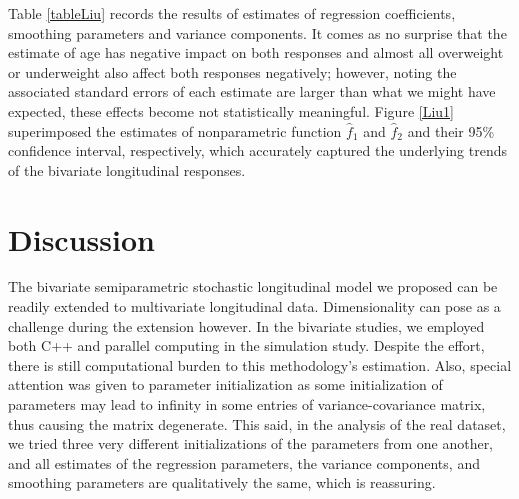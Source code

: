 \documentclass[article,lineno]{biometrika}
\begin{document}
Table \ref{tableLiu} records the results of estimates of regression coefficients, smoothing parameters and variance components. It comes as no surprise that the estimate of age has negative impact on both responses and almost all overweight or underweight also affect  both responses negatively; however, noting the associated standard errors of each estimate are larger than what we might have expected, these effects become not statistically meaningful. 
Figure \ref{Liu1} superimposed the estimates of nonparametric function $\hat f_1$ and $\hat f_2$ and their 95\% confidence interval, respectively, which accurately captured the underlying trends of the bivariate longitudinal responses.


%
%
%
\section{Discussion}


The bivariate semiparametric stochastic longitudinal model we proposed can be readily extended to multivariate longitudinal data.   
Dimensionality can pose as a challenge during the extension however. In the bivariate studies, we employed both C++ and parallel computing in the simulation study. Despite the effort, there is still computational burden to this methodology's estimation. Also, special attention was given to parameter initialization as some initialization of parameters may lead to infinity in some entries of variance-covariance matrix, thus causing the matrix degenerate. This said, in the analysis of the real dataset, we tried three very different initializations of the parameters from one another, and all estimates of the regression parameters, the variance components, and smoothing parameters are qualitatively the same, which is reassuring. 
\end{document}
